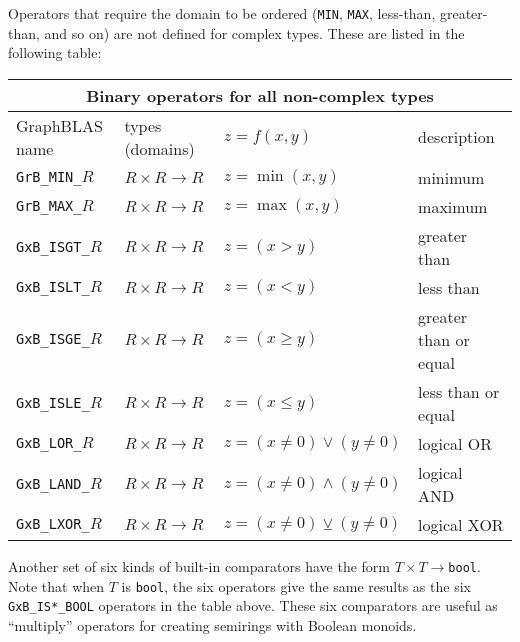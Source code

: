 \documentclass[12pt]{article}
\begin{document}
Operators that require the domain to be ordered (\verb'MIN', \verb'MAX',
less-than, greater-than, and so on) are not defined for
complex types.  These are listed in the following table:

\vspace{0.2in}
{\footnotesize
\begin{tabular}{|llll|}
\hline
\multicolumn{4}{|c|}{Binary operators for all non-complex types} \\
\hline
GraphBLAS name        & types (domains)            & $z=f(x,y)$      & description \\
\hline
\verb'GrB_MIN_'$R$    & $R \times R \rightarrow R$ & $z = \min(x,y)$ & minimum \\
\verb'GrB_MAX_'$R$    & $R \times R \rightarrow R$ & $z = \max(x,y)$ & maximum \\
\hline
\verb'GxB_ISGT_'$R$   & $R \times R \rightarrow R$ & $z = (x >   y)$ & greater than \\
\verb'GxB_ISLT_'$R$   & $R \times R \rightarrow R$ & $z = (x <   y)$ & less than  \\
\verb'GxB_ISGE_'$R$   & $R \times R \rightarrow R$ & $z = (x \ge y)$ & greater than or equal \\
\verb'GxB_ISLE_'$R$   & $R \times R \rightarrow R$ & $z = (x \le y)$ & less than or equal  \\
\hline
\verb'GxB_LOR_'$R$    & $R \times R \rightarrow R$ & $z = (x \ne 0) \vee    (y \ne 0) $ & logical OR \\
\verb'GxB_LAND_'$R$   & $R \times R \rightarrow R$ & $z = (x \ne 0) \wedge  (y \ne 0) $ & logical AND \\
\verb'GxB_LXOR_'$R$   & $R \times R \rightarrow R$ & $z = (x \ne 0) \veebar (y \ne 0) $ & logical XOR \\
\hline
\end{tabular}
}
\vspace{0.2in}

Another set of six kinds of built-in comparators have the form $T
\times T \rightarrow $\verb'bool'.  Note that when $T$ is \verb'bool', the six
operators give the same results as the six \verb'GxB_IS*_BOOL' operators in the
table above.  These six comparators are useful as ``multiply''
operators for creating semirings with Boolean monoids.
\end{document}
